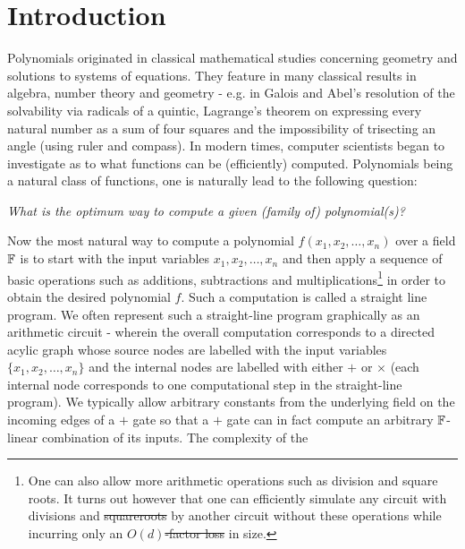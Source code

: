 \documentclass{birkjour}
\providecommand{\DIFaddtex}[1]{{\protect\color{blue}\uwave{#1}}} %
\providecommand{\DIFdeltex}[1]{{\protect\color{red}\sout{#1}}}                      %
\providecommand{\DIFaddbegin}{} %
\providecommand{\DIFaddend}{} %
\providecommand{\DIFdelbegin}{} %
\providecommand{\DIFdelend}{} %
\providecommand{\DIFadd}[1]{\texorpdfstring{\DIFaddtex{#1}}{#1}} %
\providecommand{\DIFdel}[1]{\texorpdfstring{\DIFdeltex{#1}}{}} %
\begin{document}
\section{Introduction}\label{sec:introduction}
Polynomials originated in classical mathematical studies concerning
geometry and solutions to systems of equations. They feature in many
classical results in algebra, number theory and geometry - e.g. in
Galois and Abel's resolution of the solvability via radicals of a
quintic, Lagrange's theorem on expressing every natural number as a
sum of four squares and the impossibility of trisecting an angle
(using ruler and compass). In modern times, computer scientists began
to investigate as to what functions can be (efficiently)
computed. Polynomials being a natural class of functions, one is
naturally lead to the following question:
	\begin{center}
		\begin{minipage}{0.8\textwidth}
			{\em What is the optimum way to compute a given (family of) polynomial(s)?}
		\end{minipage}
	\end{center}
	Now the most natural way to compute a polynomial $f(x_1, x_2, \ldots, x_n) $ 
	over a field $\mathbb{F}$ is to start with the input variables 
	$x_1, x_2, \ldots, x_n$ and then apply a sequence of basic 
	operations such as additions, subtractions and 
	multiplications\footnote{
		One can also allow more arithmetic operations such as division 
		and square roots. It turns out however that one can efficiently 
		simulate any circuit with divisions and \DIFdelbegin \DIFdel{squareroots }\DIFdelend \DIFaddbegin \DIFadd{square roots }\DIFaddend by another 
		circuit without these operations while incurring only an 
		\DIFdelbegin \DIFdel{$O(d)$-factor loss }\DIFdelend \DIFaddbegin \DIFadd{polynomial factor increase }\DIFaddend in size.
	}
	in order to obtain the desired polynomial $f$. Such a computation 
	is called a straight line program. We often represent such a 
	straight-line program graphically as an arithmetic circuit - 
	wherein the overall computation corresponds to a directed acylic 
	graph whose source nodes are labelled with the input variables 
	$\{ x_1, x_2, \ldots, x_n \}$ and the internal nodes are labelled 
	with either $+$ or $\times$ (each internal node corresponds to one 
	computational step in the straight-line program). We typically allow 
	arbitrary constants from the underlying field on the incoming edges 
	of a $+$ gate so that a $+$ gate can in fact compute an arbitrary 
	$\mathbb{F}$-linear combination of its inputs. The complexity of the 
\end{document}

